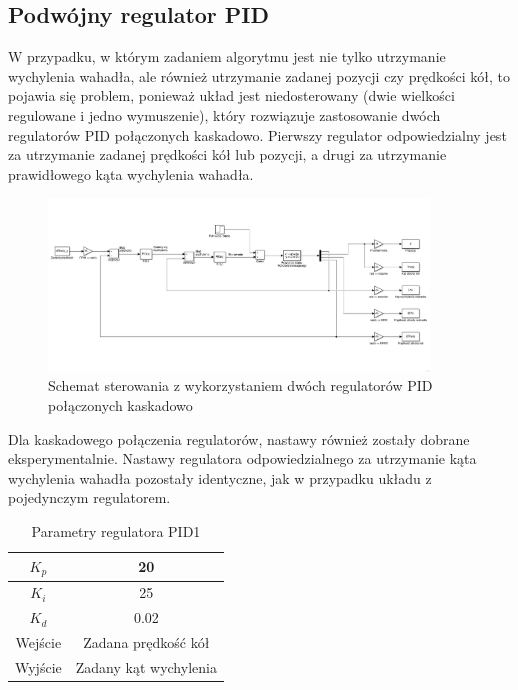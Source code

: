 \newpage

\subsection{Podwójny regulator PID}
W przypadku, w którym zadaniem algorytmu jest nie tylko utrzymanie wychylenia wahadła, ale również utrzymanie zadanej pozycji czy prędkości kół, to pojawia się problem, ponieważ układ jest niedosterowany (dwie wielkości regulowane i jedno wymuszenie), który rozwiązuje zastosowanie dwóch regulatorów PID połączonych kaskadowo. Pierwszy regulator odpowiedzialny jest za utrzymanie zadanej prędkości kół lub pozycji, a drugi za utrzymanie prawidłowego kąta wychylenia wahadła. 

\begin{figure}[h!]
    \centering
	\includegraphics[width=0.9\textwidth]{Rysunki/Rozdzial02/Podwojny_PID.png}
	\caption{Schemat sterowania z wykorzystaniem dwóch regulatorów PID połączonych kaskadowo}
\end{figure}

Dla kaskadowego połączenia regulatorów, nastawy również zostały dobrane eksperymentalnie. Nastawy regulatora odpowiedzialnego za utrzymanie kąta wychylenia wahadła pozostały identyczne, jak w przypadku układu z pojedynczym regulatorem.
\begin{table}[h!]
    \centering
    \begin{tabular}{|c|c|}
        \hline
        $K_p$ & 20 \\
        \hline
        $K_i$ & 25 \\
        \hline
        $K_d$ & 0.02 \\
        \hline
        Wejście & Zadana prędkość kół \\
        \hline
        Wyjście & Zadany kąt wychylenia \\
        \hline
    \end{tabular}
        
    \caption{Parametry regulatora PID1}
    \label{Parametry PID1}
\end{table}

